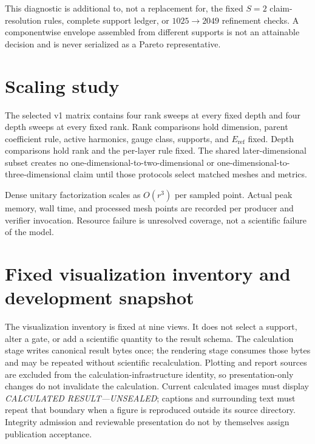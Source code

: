 \documentclass[11pt]{article}
\begin{document}
This diagnostic is additional to, not a replacement for, the fixed $S=2$ claim-resolution
rules, complete support ledger, or $1025\rightarrow2049$ refinement checks. A
componentwise envelope assembled from different supports is not an attainable decision
and is never serialized as a Pareto representative.

\section{Scaling study}

The selected v1 matrix contains four rank sweeps at every fixed depth and four depth
sweeps at every fixed rank. Rank comparisons hold dimension, parent coefficient rule,
active harmonics, gauge class, supports, and $E_{\mathrm{ref}}$ fixed. Depth comparisons
hold rank and the per-layer rule fixed. The shared later-dimensional subset creates no
one-dimensional-to-two-dimensional or one-dimensional-to-three-dimensional claim until those protocols select matched meshes and metrics.

Dense unitary factorization scales as $O(r^3)$ per sampled point. Actual peak memory,
wall time, and processed mesh points are recorded per producer and verifier invocation.
Resource failure is unresolved coverage, not a scientific failure of the model.

\section{Fixed visualization inventory and development snapshot}
\label{sec:protocol-development-plots}

The visualization inventory is fixed at nine views. It does not select a support, alter a
gate, or add a scientific quantity to the result schema. The calculation stage writes
canonical result bytes once; the rendering stage consumes those bytes and may be repeated
without scientific recalculation. Plotting and report sources are excluded from the
calculation-infrastructure identity, so presentation-only changes do not invalidate the
calculation. Current calculated images must display
\emph{CALCULATED RESULT---UNSEALED}; captions and surrounding text must repeat that
boundary when a figure is reproduced outside its source directory. Integrity admission
and reviewable presentation do not by themselves assign publication acceptance.
\end{document}
